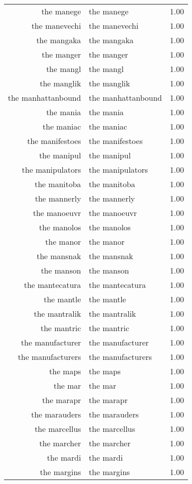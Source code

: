 \begin{table}[ht]
\begin{tabular}{rlr}
  the manege & the manege & 1.00 \\ 
  the manevechi & the manevechi & 1.00 \\ 
  the mangaka & the mangaka & 1.00 \\ 
  the manger & the manger & 1.00 \\ 
  the mangl & the mangl & 1.00 \\ 
  the manglik & the manglik & 1.00 \\ 
  the manhattanbound & the manhattanbound & 1.00 \\ 
  the mania & the mania & 1.00 \\ 
  the maniac & the maniac & 1.00 \\ 
  the manifestoes & the manifestoes & 1.00 \\ 
  the manipul & the manipul & 1.00 \\ 
  the manipulators & the manipulators & 1.00 \\ 
  the manitoba & the manitoba & 1.00 \\ 
  the mannerly & the mannerly & 1.00 \\ 
  the manoeuvr & the manoeuvr & 1.00 \\ 
  the manolos & the manolos & 1.00 \\ 
  the manor & the manor & 1.00 \\ 
  the mansnak & the mansnak & 1.00 \\ 
  the manson & the manson & 1.00 \\ 
  the mantecatura & the mantecatura & 1.00 \\ 
  the mantle & the mantle & 1.00 \\ 
  the mantralik & the mantralik & 1.00 \\ 
  the mantric & the mantric & 1.00 \\ 
  the manufacturer & the manufacturer & 1.00 \\ 
  the manufacturers & the manufacturers & 1.00 \\ 
  the maps & the maps & 1.00 \\ 
  the mar & the mar & 1.00 \\ 
  the marapr & the marapr & 1.00 \\ 
  the marauders & the marauders & 1.00 \\ 
  the marcellus & the marcellus & 1.00 \\ 
  the marcher & the marcher & 1.00 \\ 
  the mardi & the mardi & 1.00 \\ 
  the margins & the margins & 1.00 \\ 

\end{tabular}
\end{table}
